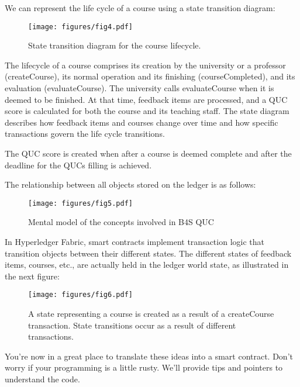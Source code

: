 \documentclass[12pt,a4paper]{article}
\theoremstyle{definition}
\begin{document}
    We can represent the life cycle of a course using a state transition diagram:

    \begin{figure}[h!]
        \centering
        \texttt{[image: figures/fig4.pdf]}
        \caption{State transition diagram for the course lifecycle.}
        \label{fig:course_lf}
    \end{figure}

    The lifecycle of a course comprises its creation by the university or a professor (createCourse), its normal operation and its finishing (courseCompleted), and its evaluation (evaluateCourse). The university calls evaluateCourse when it is deemed to be finished. At that time, feedback items are processed, and a QUC score is calculated for both the course and its teaching staff.
    The state diagram describes how feedback items and courses change over time and how specific transactions govern the life cycle transitions.

    The QUC score is created when after a course is deemed complete and after the deadline for the QUCs filling is achieved.

    The relationship between all objects stored on the ledger is as follows:

    \begin{figure}[h!]
        \centering
        \texttt{[image: figures/fig5.pdf]}
        \caption{Mental model of the concepts involved in B4S QUC}
        \label{fig:mental_model}
    \end{figure}

    In Hyperledger Fabric, smart contracts implement transaction logic that transition objects between their different states. The different states of feedback items, courses, etc., are actually held in the ledger world state, as illustrated in the next figure:

    \begin{figure}[h!]
        \centering
        \texttt{[image: figures/fig6.pdf]}
        \caption{A state representing a course is created as a result of a createCourse transaction. State transitions occur as a result of different transactions.}
        \label{fig:course_lf_2}
    \end{figure}


    You’re now in a great place to translate these ideas into a smart contract. Don’t worry if your programming is a little rusty. We’ll provide tips and pointers to understand the code.
\end{document}

